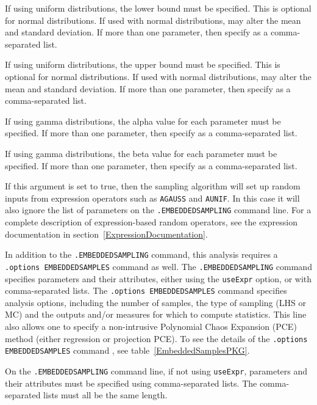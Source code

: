 \begin{Command}
\begin{Arguments}
If using uniform distributions, the lower bound must be specified.
This is optional for normal distributions.  If used with normal
distributions, may alter the mean and standard deviation.
If more than one parameter, then specify as a comma-separated list.

If using uniform distributions, the upper bound must be specified.
This is optional for normal distributions.  If used with normal
distributions, may alter the mean and standard deviation.
If more than one parameter, then specify as a comma-separated list.

If using gamma distributions, the alpha value for each parameter
must be specified.  If more than one parameter, then specify as a
comma-separated list.

If using gamma distributions, the beta value for each parameter
must be specified.  If more than one parameter, then specify as a
comma-separated list.

If this argument is set to true, then the sampling algorithm will set up random 
  inputs from expression operators such as \verb|AGAUSS| and \verb|AUNIF|.  In 
  this case it will also ignore the list of parameters on the \verb|.EMBEDDEDSAMPLING| command line.
  For a complete description of expression-based random operators, see the expression
  documentation in section~\ref{ExpressionDocumentation}.

\end{Arguments}

\comments

In addition to the \verb|.EMBEDDEDSAMPLING| command, this analysis
requires a \verb|.options EMBEDDEDSAMPLES| command as well.  The
\verb|.EMBEDDEDSAMPLING| command specifies parameters and their
attributes, either using the \verb|useExpr| option, or with 
comma-separated lists.  The \verb|.options EMBEDDEDSAMPLES| command specifies
analysis options, including the number of samples, the type of
sampling (LHS or MC) 
and the outputs and/or measures for which to compute statistics.  
This line also allows one to specify a non-intrusive Polynomial Chaos 
Expansion (PCE) method (either regression or projection PCE).
To see the details of the \verb|.options EMBEDDEDSAMPLES| command , see table~\ref{EmbeddedSamplesPKG}.

On the \verb|.EMBEDDEDSAMPLING| command line, if not using \verb|useExpr|, 
parameters and their
attributes must be specified using comma-separated lists. The
comma-separated lists must all be the same length.


\end{Command}
